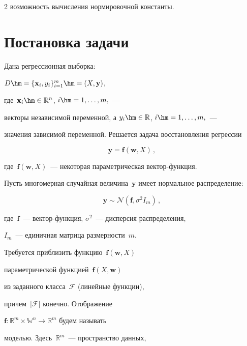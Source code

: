 \begin{multicols}{2}
воз\-мож\-ность вы\-чис\-ле\-ния нормировочной константы.







\section{Постановка задачи}



Дана регрессионная выборка: 

$D\hm=\{\mathbf{x}_i,y_i\}_{i=1}^m\hm=(X,\mathbf{y})$, 

где~$\mathbf{x}_i \hm\in \mathbb{R}^n$, $i \hm= 1, \dots, m,$~--- 

векторы независимой переменной, а $y_i \hm\in \mathbb{R}$, $i \hm= 1, \dots, m,$~--- 

значения зависимой переменной. Решается задача восстановления регрессии

\begin{equation}

\label {eq: y}

\mathbf{y}=\mathbf{f}(\mathbf{w}, X)\,,

\end{equation}

 где~$\mathbf{f}(\mathbf{w}, X)$~--- некоторая параметрическая век\-тор-функ\-ция. 

 Пусть многомерная случайная величина~$\mathbf{y}$ имеет нормальное распределение: 

 $$

 \mathbf{y}\sim\mathcal{N}(\mathbf{f},\sigma^2 I_m)\,,

 $$ 

 где~$\mathbf{f}$~--- век\-тор-функ\-ция, $\sigma^2$~--- дисперсия распределения, 

 $I_m$~--- единичная матрица размерности~$m$.



 Требуется приблизить функцию~$\mathbf{f}(\mathbf{w}, X)$ 

 параметрической функцией~$\widehat{\mathbf{f}}(X,\mathbf{w})$ 

 из заданного класса~$\mathcal{F}$ (линейные функции), 

 причем~$|\mathcal{F}|$ конечно. Отображение

 $\mathbf{f}:\mathbb{R}^m \times \mathbb{W}^n \rightarrow \mathbb{R}^m$ будем называть 

 моделью. Здесь~$\mathbb{R}^m$~--- пространство данных,\linebreak 


\end{multicols}
